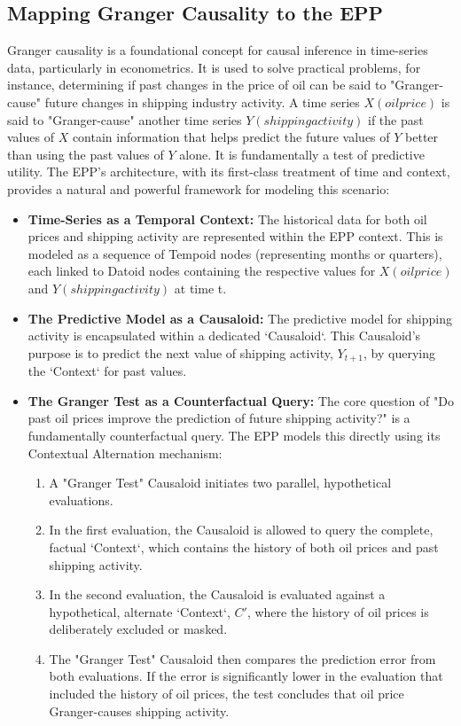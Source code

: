 \subsection{Mapping Granger Causality to the EPP}
\label{sec:epp_Granger_Causality}

Granger causality is a foundational concept for causal inference in time-series data, particularly in econometrics. It is used to solve practical problems, for instance, determining if past changes in the price of oil can be said to "Granger-cause" future changes in shipping industry activity. 
A time series $X(oil price)$ is said to "Granger-cause" another time series $Y(shipping activity)$ if the past values of  $X$ contain information that helps predict the future values of $Y$ 
 better than using the past values of $Y$ alone. It is fundamentally a test of predictive utility. The EPP's architecture, with its first-class treatment of time and context, provides a natural and powerful framework for modeling this scenario:

\begin{itemize}
	\item \textbf{Time-Series as a Temporal Context:} The historical data for both oil prices and shipping activity are represented within the EPP context. This is modeled as a sequence of Tempoid nodes (representing months or quarters), each linked to Datoid nodes containing the respective values for $X(oil price)$ and $Y(shipping activity)$ at time t.

	\item \textbf{The Predictive Model as a Causaloid:} The predictive model for shipping activity is encapsulated within a dedicated `Causaloid`. This Causaloid's purpose is to predict the next value of shipping activity, $Y_{t+1}$, by querying the `Context` for past values.

	\item \textbf{The Granger Test as a Counterfactual Query:} The core question of "Do past oil prices improve the prediction of future shipping activity?" is a fundamentally counterfactual query. The EPP models this directly using its Contextual Alternation mechanism:
    \begin{enumerate}
        \item A "Granger Test" Causaloid initiates two parallel, hypothetical evaluations.
        \item In the first evaluation, the Causaloid is allowed to query the complete, factual `Context`, which contains the history of both oil prices and past shipping activity.
        \item In the second evaluation, the Causaloid is evaluated against a hypothetical, alternate `Context`, $C'$, where the history of oil prices is deliberately excluded or masked.
        \item The "Granger Test" Causaloid then compares the prediction error from both evaluations. If the error is significantly lower in the evaluation that included the history of oil prices, the test concludes that oil price Granger-causes shipping activity.
    \end{enumerate}

\end{itemize}

